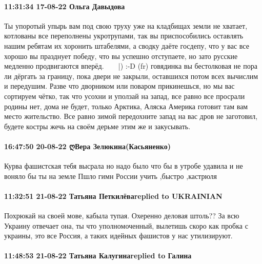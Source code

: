  
 
 
 
 

\paragraph{11:31:34 17-08-22 Ольга Давыдова}

Ты упоротый упырь вам под свою труху уже на кладбищах земли не хватает,
котлованы все переполнены укротрупами, так вы приспособились оставлять нашим
ребятам их хоронить штабелями, а сводку даёте госдепу, что у вас все хорошо вы
празднует победу, что вы успешно отступаете, но зато русские медленно
продвигаются вперёд. 🤣🤣🤣😜😜😜|) :-D (fr) говядинка вы бестолковая не пора
ли дёргать за границу, пока двери не закрыли, оставшихся потом всех вычислим и
передушим. Разве что дворником или поваром прикинешься, но мы вас сортируем
чётко, так что усохни и уползай на запад, все равно все просрали родины нет,
дома не будет, только Арктика, Аляска Америка готовит там вам место жительство.
Все равно зимой передохните запад на вас дров не заготовил, будете костры жечь
на своём дерьме этим же и закусывать.

\paragraph{16:47:50 20-08-22 ღВера Зелюкина(Касьяненко)}

Курва фашистская тебя высрала но надо было что бы в утробе удавила и не воняло
бы ты на земле Пшло гимн России учить ,быстро ,кастрюля

\paragraph{11:32:51 21-08-22 Татьяна Петкилёваreplied to UKRAINIAN}

Похрюкай на своей мове, кабыла тупая. Охеренно деловая штоль?? За всю Украину
отвечает она, ты что уполномоченный, вылетишь скоро как пробка с украины, это
все Россия, а таких идейных фашистов у нас утилизируют.

\paragraph{11:48:53 21-08-22 Татьяна Калугинаreplied to Галина}

